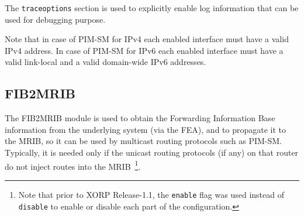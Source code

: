 The {\tt traceoptions} section is used to explicitly enable log information
that can be used for debugging purpose.

Note that in case of PIM-SM for IPv4 each enabled interface must have a
valid IPv4 address. In case of PIM-SM for IPv6 each enabled interface
must have a valid link-local and a valid domain-wide IPv6 addresses.

\newpage
\subsection{FIB2MRIB}
\label{sec:protocols:fib2mrib}

The FIB2MRIB module is used to obtain the Forwarding Information Base
information from the underlying system (via the FEA), and to propagate
it to the MRIB, so it can be used by multicast routing protocols
such as PIM-SM. Typically, it is needed only if the unicast routing
protocols (if any) on that router do not inject routes into the
MRIB~\footnote{Note that prior to XORP Release-1.1, the {\tt enable} flag
was used instead of {\tt disable} to enable or disable each part of the
configuration.}.

\vspace{0.1in}
\noindent{}
\vspace{0.1in}


